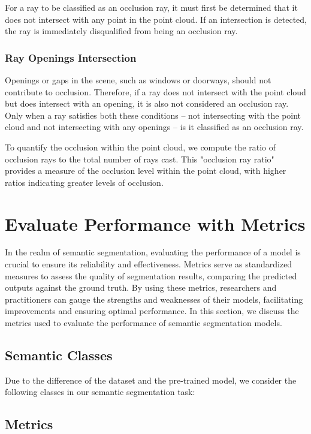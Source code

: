 \documentclass[11pt, a4paper,oneside,chapterprefix=false]{scrbook}
\begin{document}
For a ray to be classified as an occlusion ray, it must first be determined that it does not intersect with any point in the point cloud. If an intersection is detected, the ray is immediately disqualified from being an occlusion ray.

\subsubsection{Ray Openings Intersection}

Openings or gaps in the scene, such as windows or doorways, should not contribute to occlusion. Therefore, if a ray does not intersect with the point cloud but does intersect with an opening, it is also not considered an occlusion ray. Only when a ray satisfies both these conditions – not intersecting with the point cloud and not intersecting with any openings – is it classified as an occlusion ray.

To quantify the occlusion within the point cloud, we compute the ratio of occlusion rays to the total number of rays cast. This "occlusion ray ratio" provides a measure of the occlusion level within the point cloud, with higher ratios indicating greater levels of occlusion.


\section{Evaluate Performance with Metrics}

In the realm of semantic segmentation, evaluating the performance of a model is crucial to ensure its reliability and effectiveness. Metrics serve as standardized measures to assess the quality of segmentation results, comparing the predicted outputs against the ground truth. By using these metrics, researchers and practitioners can gauge the strengths and weaknesses of their models, facilitating improvements and ensuring optimal performance. In this section, we discuss the metrics used to evaluate the performance of semantic segmentation models.

\subsection{Semantic Classes}

Due to the difference of the dataset and the pre-trained model, we consider the following classes in our semantic segmentation task:

\subsection{Metrics}
\end{document}
